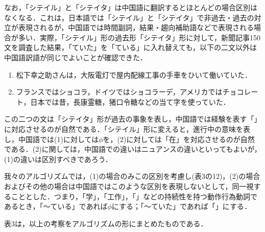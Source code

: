 なお，「シテイル」と「シテイタ」は中国語に翻訳するとほとんどの場合区別はなくなる．これは，日本語では「シテイル」と「シテイタ」で非過去・過去の対立が表現されるが，中国語では時間副詞，結果・趨向補助語などで表現される場合が多い．実際，「シテイル」形の過去形「シテイタ」形に対して，新聞記事150文を調査した結果，「ていた」を「ている」に入れ替えても，以下の二文以外は中国語訳語が同じでよいことが確認できた．
\begin{enumerate}
\item 松下幸之助さんは，大阪電灯で屋内配線工事の手車をひいて働いていた．
\item フランスではショコラ，ドイツではショコラーデ，アメリカではチョコレート，日本では昔，長康霊糖，猪口令糖などの当て字を使っていた．
\end{enumerate}

この二つの文は「シテイタ」形が過去の事象を表し，中国語では経験を表す「」に対応させるのが自然である．「シテイル」形に変えると，進行中の意味を表し，中国語では(1)に対しては$\phi$を，(2)に対しては「在」を対応させるのが自然である．(2)に関しては，中国語での違いはニュアンスの違いといってもよいが，(1)の違いは区別すべきであろう．

我々のアルゴリズムでは，(1)の場合のみこの区別を考慮し(表3の12)，(2)の場合およびその他の場合は中国語ではこのような区別を表現しないとして，同一視することとした．つまり，「学」，「工作」，「」などの持続性を持つ動作行為動詞であるとき，「〜ている」であれば$\phi$にする；「〜ていた」であれば「」にする．

表3は，以上の考察をアルゴリズムの形にまとめたものである．

